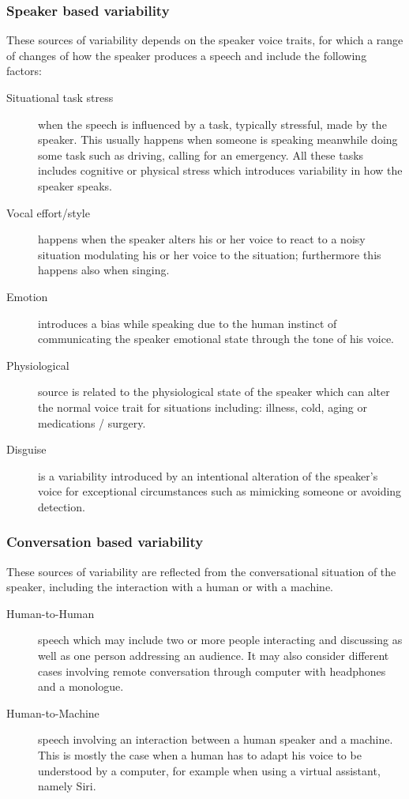 \subsubsection{Speaker based variability}
These sources of variability depends on the speaker voice traits,
for which a range of changes of how the speaker produces a speech and
include the following factors:

\begin{description}
    \item[Situational task stress] when the speech is influenced by a task,
    typically stressful, made by the speaker. This usually happens when someone
    is speaking meanwhile doing some task such as driving, calling for an emergency.
    All these tasks includes cognitive or physical stress which introduces variability
    in how the speaker speaks.
    \item[Vocal effort/style] happens when the speaker alters his or her voice to react to
    a noisy situation modulating his or her voice to the situation; furthermore this happens
    also when singing.
    \item[Emotion] introduces a bias while speaking due to the human instinct of communicating
    the speaker emotional state through the tone of his voice.
    \item[Physiological] source is related to the physiological state of the speaker which
    can alter the normal voice trait for situations including: illness, cold, aging or medications / surgery.
    \item[Disguise] is a variability introduced by an intentional alteration of the speaker's voice
    for exceptional circumstances such as mimicking someone or avoiding detection.
\end{description}



\subsubsection{Conversation based variability}

These sources of variability are reflected from the conversational
situation of the speaker, including the interaction with a human
or with a machine.

\begin{description}
    \item[Human-to-Human] speech which may include two or more
    people interacting and discussing as well as one person addressing
    an audience. It may also consider different cases involving remote conversation
    through computer with headphones and a monologue.
    \item[Human-to-Machine] speech involving an interaction between a human
    speaker and a machine. This is mostly the case when a human has to adapt his
    voice to be understood by a computer, for example when using a virtual assistant, namely
    Siri.
\end{description}


